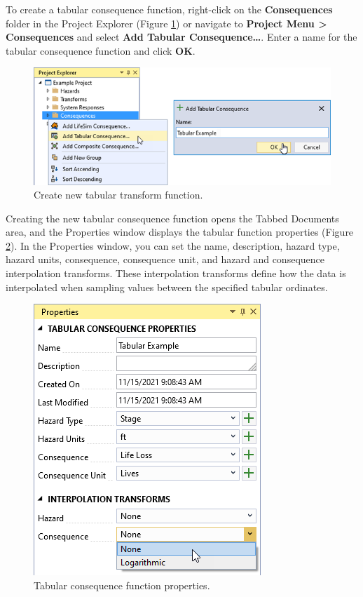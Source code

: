 \documentclass[
]{book}
\begin{document}
To create a tabular consequence function, right-click on the \textbf{Consequences} folder in the Project Explorer (Figure \ref{fig:figure-116}) or navigate to \textbf{Project Menu \textgreater{} Consequences} and select \textbf{Add Tabular Consequence\ldots{}}. Enter a name for the tabular consequence function and click \textbf{OK}.

\begin{figure}

{\centering \includegraphics{images/figure116} 

}

\caption{Create new tabular transform function.}\label{fig:figure-116}
\end{figure}

Creating the new tabular consequence function opens the Tabbed Documents area, and the Properties window displays the tabular function properties (Figure \ref{fig:figure-117}). In the Properties window, you can set the name, description, hazard type, hazard units, consequence, consequence unit, and hazard and consequence interpolation transforms. These interpolation transforms define how the data is interpolated when sampling values between the specified tabular ordinates.

\begin{figure}

{\centering \includegraphics{images/figure117} 

}

\caption{Tabular consequence function properties.}\label{fig:figure-117}
\end{figure}
\end{document}
